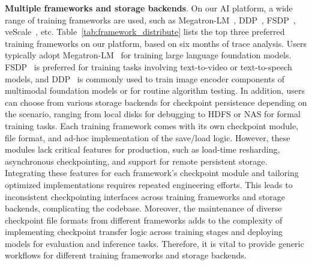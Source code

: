 \noindent \textbf{Multiple frameworks and storage backends}.
On our AI platform, a wide range of training frameworks are used, such as Megatron-LM~\cite{megatron}, DDP~\cite{ddp}, FSDP~\cite{fsdp}, veScale~\cite{megascale, vescale}, etc.
Table~\ref{tab:framework_distribute} lists the top three preferred training frameworks on our platform, based on six months of trace analysis. %
Users typically adopt Megatron-LM~\cite{megatron} for training large language foundation models.
FSDP~\cite{fsdp} is preferred for training tasks involving text-to-video or text-to-speech models, 
and DDP~\cite{ddp} is commonly used to train image encoder components of multimodal foundation models or for routine algorithm testing.
In addition, %
users can choose from various storage backends for checkpoint persistence depending on the scenario, ranging from local disks for debugging to HDFS or NAS for formal training tasks.
Each training framework comes with its own checkpoint module, file format, and ad-hoc implementation of the save/load logic.
However, these modules lack critical features for production, such as load-time resharding, asynchronous checkpointing, and support for remote persistent storage.
Integrating these features for each framework's checkpoint module and tailoring optimized implementations requires repeated engineering efforts.
This leads to inconsistent checkpointing interfaces across training frameworks and storage backends, complicating the codebase.
Moreover, the maintenance of diverse checkpoint file formats from different frameworks adds to the complexity of implementing checkpoint transfer logic across training stages and deploying models for evaluation and inference tasks.     
Therefore, it is vital to provide generic workflows for different training frameworks and storage backends. 

